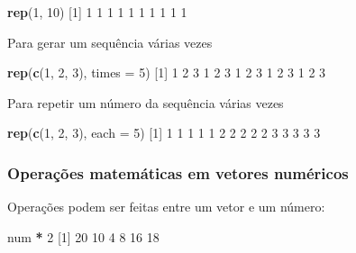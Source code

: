 \documentclass[10pt,a4paper]{book}
\newenvironment{Shaded}{\begin{snugshade}}{\end{snugshade}}
\newcommand{\KeywordTok}[1]{\textcolor[rgb]{0.13,0.29,0.53}{\textbf{#1}}}
\newcommand{\DataTypeTok}[1]{\textcolor[rgb]{0.13,0.29,0.53}{#1}}
\newcommand{\DecValTok}[1]{\textcolor[rgb]{0.00,0.00,0.81}{#1}}
\newcommand{\StringTok}[1]{\textcolor[rgb]{0.31,0.60,0.02}{#1}}
\newcommand{\OperatorTok}[1]{\textcolor[rgb]{0.81,0.36,0.00}{\textbf{#1}}}
\newcommand{\NormalTok}[1]{#1}
\begin{document}
\begin{Shaded}
\begin{Highlighting}[]
\KeywordTok{rep}\NormalTok{(}\DecValTok{1}\NormalTok{, }\DecValTok{10}\NormalTok{)}
\NormalTok{ [}\DecValTok{1}\NormalTok{] }\DecValTok{1} \DecValTok{1} \DecValTok{1} \DecValTok{1} \DecValTok{1} \DecValTok{1} \DecValTok{1} \DecValTok{1} \DecValTok{1} \DecValTok{1}
\end{Highlighting}
\end{Shaded}

Para gerar um sequência várias vezes

\begin{Shaded}
\begin{Highlighting}[]
\KeywordTok{rep}\NormalTok{(}\KeywordTok{c}\NormalTok{(}\DecValTok{1}\NormalTok{, }\DecValTok{2}\NormalTok{, }\DecValTok{3}\NormalTok{), }\DataTypeTok{times =} \DecValTok{5}\NormalTok{)}
\NormalTok{ [}\DecValTok{1}\NormalTok{] }\DecValTok{1} \DecValTok{2} \DecValTok{3} \DecValTok{1} \DecValTok{2} \DecValTok{3} \DecValTok{1} \DecValTok{2} \DecValTok{3} \DecValTok{1} \DecValTok{2} \DecValTok{3} \DecValTok{1} \DecValTok{2} \DecValTok{3}
\end{Highlighting}
\end{Shaded}

Para repetir um número da sequência várias vezes

\begin{Shaded}
\begin{Highlighting}[]
\KeywordTok{rep}\NormalTok{(}\KeywordTok{c}\NormalTok{(}\DecValTok{1}\NormalTok{, }\DecValTok{2}\NormalTok{, }\DecValTok{3}\NormalTok{), }\DataTypeTok{each =} \DecValTok{5}\NormalTok{)}
\NormalTok{ [}\DecValTok{1}\NormalTok{] }\DecValTok{1} \DecValTok{1} \DecValTok{1} \DecValTok{1} \DecValTok{1} \DecValTok{2} \DecValTok{2} \DecValTok{2} \DecValTok{2} \DecValTok{2} \DecValTok{3} \DecValTok{3} \DecValTok{3} \DecValTok{3} \DecValTok{3}
\end{Highlighting}
\end{Shaded}

\subsubsection{Operações matemáticas em vetores
numéricos}\label{operacoes-matematicas-em-vetores-numericos}

Operações podem ser feitas entre um vetor e um número:

\begin{Shaded}
\begin{Highlighting}[]
\NormalTok{num }\OperatorTok{*}\StringTok{ }\DecValTok{2}
\NormalTok{[}\DecValTok{1}\NormalTok{] }\DecValTok{20} \DecValTok{10}  \DecValTok{4}  \DecValTok{8} \DecValTok{16} \DecValTok{18}
\end{Highlighting}
\end{Shaded}
\end{document}
